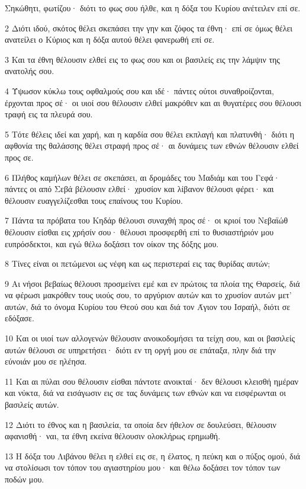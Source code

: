 \par Σηκώθητι, φωτίζου· διότι το φως σου ήλθε, και η δόξα του Κυρίου ανέτειλεν επί σε.
\par 2 Διότι ιδού, σκότος θέλει σκεπάσει την γην και ζόφος τα έθνη· επί σε όμως θέλει ανατείλει ο Κύριος και η δόξα αυτού θέλει φανερωθή επί σε.
\par 3 Και τα έθνη θέλουσιν ελθεί εις το φως σου και οι βασιλείς εις την λάμψιν της ανατολής σου.
\par 4 Ύψωσον κύκλω τους οφθαλμούς σου και ιδέ· πάντες ούτοι συναθροίζονται, έρχονται προς σέ· οι υιοί σου θέλουσιν ελθεί μακρόθεν και αι θυγατέρες σου θέλουσι τραφή εις τα πλευρά σου.
\par 5 Τότε θέλεις ιδεί και χαρή, και η καρδία σου θέλει εκπλαγή και πλατυνθή· διότι η αφθονία της θαλάσσης θέλει στραφή προς σέ· αι δυνάμεις των εθνών θέλουσιν ελθεί προς σε.
\par 6 Πλήθος καμήλων θέλει σε σκεπάσει, αι δρομάδες του Μαδιάμ και του Γεφά· πάντες οι από Σεβά βέλουσιν ελθεί· χρυσίον και λίβανον θέλουσι φέρει· και θέλουσιν ευαγγελίζεσθαι τους επαίνους του Κυρίου.
\par 7 Πάντα τα πρόβατα του Κηδάρ θέλουσι συναχθή προς σέ· οι κριοί του Νεβαϊώθ θέλουσιν είσθαι εις χρήσίν σου· θέλουσι προσφερθή επί το θυσιαστήριόν μου ευπρόσδεκτοι, και εγώ θέλω δοξάσει τον οίκον της δόξης μου.
\par 8 Τίνες είναι οι πετώμενοι ως νέφη και ως περιστεραί εις τας θυρίδας αυτών;
\par 9 Αι νήσοι βεβαίως θέλουσι προσμείνει εμέ και εν πρώτοις τα πλοία της Θαρσείς, διά να φέρωσι μακρόθεν τους υιούς σου, το αργύριον αυτών και το χρυσίον αυτών μετ' αυτών, διά το όνομα Κυρίου του Θεού σου και διά τον Άγιον του Ισραήλ, διότι σε εδόξασε.
\par 10 Και οι υιοί των αλλογενών θέλουσιν ανοικοδομήσει τα τείχη σου, και οι βασιλείς αυτών θέλουσι σε υπηρετήσει· διότι εν τη οργή μου σε επάταξα, πλην διά την εύνοιάν μου σε ηλέησα.
\par 11 Και αι πύλαι σου θέλουσιν είσθαι πάντοτε ανοικταί· δεν θέλουσι κλεισθή ημέραν και νύκτα, διά να εισάγωσιν εις σε τας δυνάμεις των εθνών και να εισφέρωνται οι βασιλείς αυτών.
\par 12 Διότι το έθνος και η βασιλεία, τα οποία δεν ήθελον σε δουλεύσει, θέλουσιν αφανισθή· ναι, τα έθνη εκείνα θέλουσιν ολοκλήρως ερημωθή.
\par 13 Η δόξα του Λιβάνου θέλει η ελθεί εις σε, η έλατος, η πεύκη και ο πύξος ομού, διά να στολίσωσι τον τόπον του αγιαστηρίου μου· και θέλω δοξάσει τον τόπον των ποδών μου.

